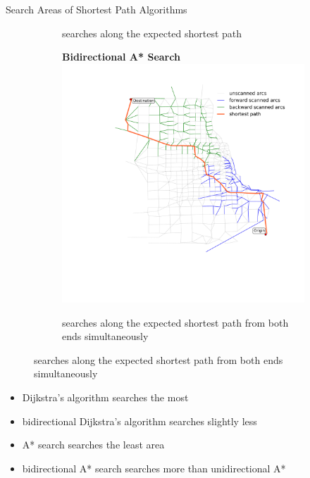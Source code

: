 \documentclass[final]{beamer}
\begin{document}
\begin{frame}{ }
\begin{columns}[t]
\begin{column}{.4\linewidth}
\begin{block}{Search Areas of Shortest Path Algorithms}
\begin{figure}
\begin{subfigure}{.5\linewidth}
                        \caption{searches \alert{along the expected} shortest path}
                    \end{subfigure}%
                    \begin{subfigure}{.5\linewidth}
                        \vspace{1.3em}
                        \centering
                        {\bfseries Bidirectional A* Search}
                        \includegraphics[width=\linewidth,trim=120px 280px 48px 60px,clip]{img/astar_bidirect}
                        \caption{searches \alert{along the expected} shortest path from \alert{both ends simultaneously}} 
                    \end{subfigure}
                \end{figure}
                \begin{itemize}
                    \itemsep.5em
                    \item Dijkstra's algorithm searches the most
                    \item bidirectional Dijkstra's algorithm searches slightly less
                    \item \alert{A* search searches the least area}
                    \item bidirectional A* search searches more than unidirectional A*
                \end{itemize}
            \end{block}


\end{column}
\end{columns}
\end{frame}
\end{document}
